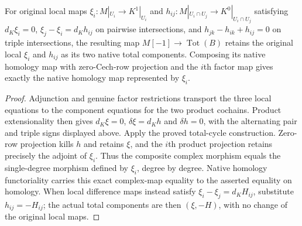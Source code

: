 \begin{theorem}
\label{thm:di-cech-degree-one-original-local-homology}
\leanok
{}
For original local maps $\xi_i:M|_{U_i}\to K^1|_{U_i}$ and
$h_{ij}:M|_{U_i\cap U_j}\to K^0|_{U_i\cap U_j}$ satisfying
$d_K\xi_i=0$, $\xi_j-\xi_i=d_Kh_{ij}$ on pairwise intersections,
and $h_{jk}-h_{ik}+h_{ij}=0$ on triple intersections, the resulting
map $M[-1]\to\operatorname{Tot}(B)$ retains the original local
$\xi_i$ and $h_{ij}$ as its two native total components. Composing its
native homology map with zero-Cech-row projection and the $i$th factor
map gives exactly the native homology map represented by $\xi_i$.
\end{theorem}
\begin{proof}
\leanok
Adjunction and genuine factor restrictions transport the three local
equations to the component equations for the two product cochains.
Product extensionality then gives $d_K\xi=0$, $\delta\xi=d_Kh$ and
$\delta h=0$, with the alternating pair and triple signs displayed above.
Apply the proved total-cycle construction. Zero-row projection kills
$h$ and retains $\xi$, and the $i$th product projection retains precisely
the adjoint of $\xi_i$. Thus the composite complex morphism equals the
single-degree morphism defined by $\xi_i$, degree by degree. Native
homology functoriality carries this exact complex-map equality to the
asserted equality on homology. When local difference maps instead satisfy
$\xi_i-\xi_j=d_KH_{ij}$, substitute $h_{ij}=-H_{ij}$; the actual total
components are then $(\xi,-H)$, with no change of the original local maps.
\end{proof}
